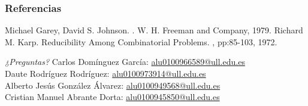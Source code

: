 \documentclass{beamer}
\begin{document}
\begin{frame}[allowframebreaks]
    \frametitle<presentation>{Referencias}
    \begin{thebibliography}{10}
        \beamertemplatebookbibitems
             Michael Garey, David S. Johnson.
            .
            \newblock W. H. Freeman and Company, 1979.
        \beamertemplatearticlebibitems
            Richard M. Karp.
            \newblock Reducibility Among Combinatorial Problems.
            , pp:85-103, 1972.
  \end{thebibliography}
\end{frame}

\begin{frame}{}
    \centering \Huge
    \emph{¿Preguntas?}
    \vfill
     Carlos Domínguez García: \url{alu0100966589@ull.edu.es}\\
     Daute Rodríguez Rodríguez: \url{alu0100973914@ull.edu.es}\\
     Alberto Jesús González Álvarez: \url{alu0100949568@ull.edu.es }\\
     Cristian Manuel Abrante Dorta: \url{alu0100945850@ull.edu.es}\\
\end{frame}
\end{document}
